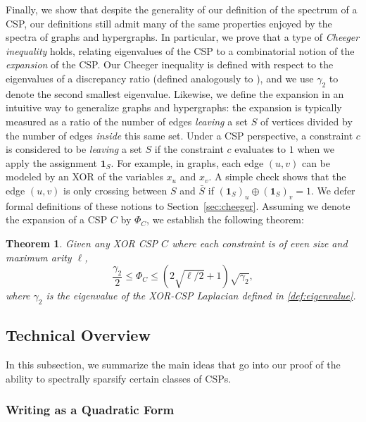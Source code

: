 \documentclass[11pt]{article}
\newtheorem{theorem}{Theorem}[section]
\theoremstyle{definition}
\begin{document}
Finally, we show that despite the generality of our definition of the spectrum of a CSP, our definitions still admit many of the same properties enjoyed by the spectra of graphs and hypergraphs. In particular, we prove that a type of \emph{Cheeger inequality} holds, relating eigenvalues of the CSP to a combinatorial notion of the \emph{expansion} of the CSP. Our Cheeger inequality is defined with respect to the eigenvalues of a discrepancy ratio (defined analogously to \cite{CLTZ18}), and we use $\gamma_2$ to denote the second smallest eigenvalue. Likewise, we define the expansion in an intuitive way to generalize graphs and hypergraphs: the expansion is typically measured as a ratio of the number of edges \emph{leaving} a set $S$ of vertices divided by the number of edges \emph{inside} this same set. Under a CSP perspective, a constraint $c$ is considered to be \emph{leaving} a set $S$ if the constraint $c$ evaluates to $1$ when we apply the assignment $\mathbf{1}_S$. For example, in graphs, each edge $(u,v)$ can be modeled by an XOR of the variables $x_u$ and $x_v$. A simple check shows that the edge $(u,v)$ is only crossing between $S$ and $\bar{S}$ if $(\mathbf{1}_S)_u \oplus (\mathbf{1}_S)_v = 1$. We defer formal definitions of these notions to Section~\cref{sec:cheeger}. Assuming we denote the expansion of a CSP $C$ by $\Phi_C$, we establish the following theorem:

\begin{theorem}
    Given any XOR CSP $C$ where each constraint is of even size and maximum arity $\ell$,
    \[
    \frac{\gamma_2}{2} \leq \Phi_C \leq \left (2 \sqrt{\ell/2} + 1 \right) \sqrt{\gamma_2},
    \]
    where $\gamma_2$ is the eigenvalue of the XOR-CSP Laplacian defined in \cref{def:eigenvalue}. 
\end{theorem}

\subsection{Technical Overview}

In this subsection, we summarize the main ideas that go into our proof of the ability to spectrally sparsify certain classes of CSPs.

\subsubsection{Writing as a Quadratic Form}
\end{document}
